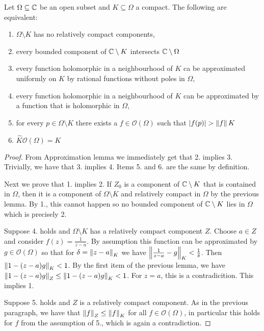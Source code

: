 \begin{izrek}
    Let $\Omega \subseteq \mathbb{C}$ be an open subset and $K \subseteq \Omega$ a compact. The following are equivalent:
    \begin{enumerate}
        \item $\Omega \setminus K$ has no relatively compact components,
        \item every bounded component of $\mathbb{C} \setminus K$ intersects $\mathbb{C} \setminus \Omega$
\item every function holomorphic in a neighbourhood of $K$ ca be approximated uniformly on $K$ by rational functions without poles in $\Omega$,
        \item every function holomorphic in a neighbourhood of $K$ can be approximated by a function that is holomorphic in $\Omega$,
        \item for every $p \in \Omega \setminus K$ there exists a $f \in \mathcal{O}(\Omega)$ such that $\left\lvert f(p)\right\rvert > \left\lVert f\right\rVert K$
        \item $\hat{K}{\mathcal{O}(\Omega)} = K$
    \end{enumerate} 
\end{izrek}
\begin{proof}
    From Approximation lemma we immediately get that 2. implies 3. Trivially, we have that 3. implies 4. Items 5. and 6. are the same by definition.

    Next we prove that 1. implies 2. If $Z_0$ is a component of $\mathbb{C} \setminus K$ that is contained in $\Omega$, then it is a component of $\Omega \setminus K$ and relatively compact in $\Omega$ by the previous lemma. By 1., this cannot happen so no bounded component of $\mathbb{C} \setminus K$ lies in $\Omega$ which is precisely 2. 

    Suppose 4. holds and $\Omega \setminus K$ has a relatively compact component $Z$. Choose $a \in Z$ and consider $f(z) = \frac{1}{z - a}$. By assumption this function can be approximated by $g \in \mathcal{O}(\Omega)$ so that for $\delta = \left\lVert z - a\right\rVert_K$ we have $\left\lVert \frac{1}{z - a} - g\right\rVert_K < \frac{1}{\delta}$. Then $\left\lVert 1 - (z - a)g\right\rVert_K < 1$. By the first item of the previous lemma, we have $\left\lVert 1 - (z - a)g\right\rVert_Z \leq \left\lVert 1 - (z - a)g\right\rVert_K < 1$. For $z = a$, this is a contradicition. This implies 1.

    Suppose 5. holds and $Z$ is a relatively compact component. As in the previous paragraph, we have that $\left\lVert f\right\rVert_Z \leq \left\lVert f\right\rVert_K$ for all $f \in \mathcal{O}(\Omega)$, in particular this holds for $f$ from the assumption of 5., which is again a contradiction. 
\end{proof}


